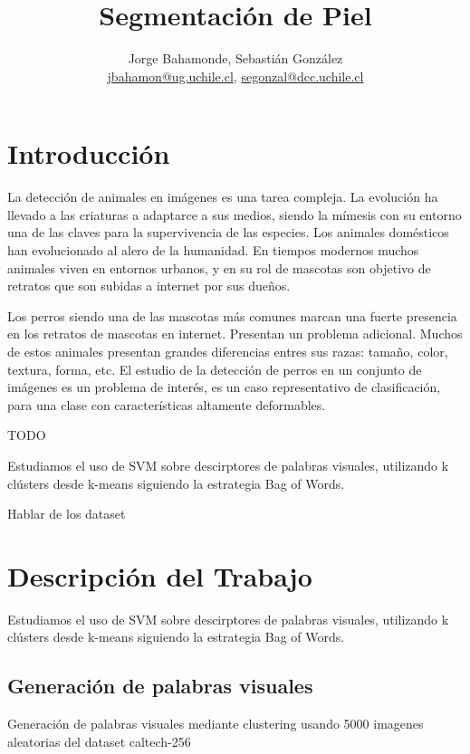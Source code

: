 \documentclass[12pt]{article}
\title{Segmentación de Piel}
\author{Jorge Bahamonde, Sebastián González\\
\small{\url{jbahamon@ug.uchile.cl}, \url{segonzal@dcc.uchile.cl}}}
\date{}
\begin{document}
\maketitle

\section{Introducción}


La detección de animales en imágenes es una tarea compleja. La evolución ha llevado a
las criaturas a adaptarce a sus medios, siendo la mímesis con su entorno una de las claves para la supervivencia de las especies.
Los animales domésticos han evolucionado al alero de la humanidad. En tiempos modernos muchos animales viven en entornos urbanos,
y en su rol de mascotas son objetivo de retratos que son subidas a internet por sus dueños.

Los perros siendo una de las mascotas más comunes marcan una fuerte presencia en los retratos de mascotas en internet.
Presentan un problema adicional. Muchos de estos animales presentan grandes diferencias entres sus razas: tamaño, color, textura, forma, etc.
El estudio de la detección de perros en un conjunto de imágenes es un problema de interés, es un caso representativo de clasificación, para una clase con características
altamente deformables.%

TODO

Estudiamos el uso de SVM sobre descirptores de palabras visuales, utilizando k clústers desde k-means siguiendo la estrategia Bag of Words.

Hablar de los dataset

\section{Descripción del Trabajo}

Estudiamos el uso de SVM sobre descirptores de palabras visuales, utilizando k clústers desde k-means siguiendo la estrategia Bag of Words.

\subsection{Generación de palabras visuales}
Generación de palabras visuales mediante clustering usando 5000 imagenes aleatorias del dataset caltech-256
\end{document}
